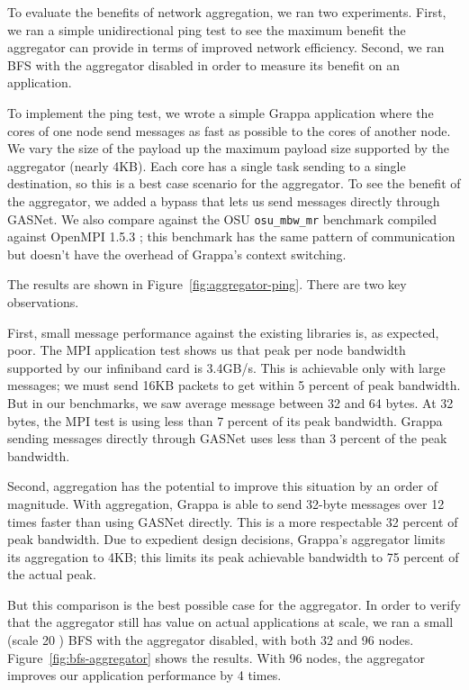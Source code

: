 To evaluate the benefits of network aggregation, we ran two experiments.
First, we ran a simple unidirectional ping test to see the maximum
benefit the aggregator can provide in terms of improved network
efficiency. Second, we ran BFS with the aggregator disabled in order to
measure its benefit on an application.

To implement the ping test, we wrote a simple Grappa application where
the cores of one node send messages as fast as possible to the cores
of another node. We vary the size of the payload up the maximum
payload size supported by the aggregator (nearly 4KB). Each core has a
single task sending to a single destination, so this is a best case
scenario for the aggregator. To see the benefit of the aggregator, we
added a bypass that lets us send messages directly through GASNet. We
also compare against the OSU \texttt{osu\_mbw\_mr} benchmark
  compiled against OpenMPI 1.5.3 ; this
benchmark has the same pattern of communication but doesn't have the
overhead of Grappa's context switching.

The results are shown in Figure~\ref{fig:aggregator-ping}. There are
two key observations.

First, small message performance against the existing libraries is, as expected, poor. The MPI application test shows us that peak per node
bandwidth supported by our infiniband card is 3.4GB/s. This is
achievable only with large messages; we must send 16KB packets to get
within 5 percent of peak bandwidth. But in our benchmarks, we saw
average message between 32 and 64 bytes. At 32 bytes, the MPI test is
using less than 7 percent of its peak bandwidth. Grappa sending
messages directly through GASNet uses less than 3 percent of the peak
bandwidth.

Second, aggregation has the potential to improve this situation by an
order of magnitude. With aggregation, Grappa is able to send 32-byte
messages over 12 times faster than using GASNet directly. This is a
more respectable 32 percent of peak bandwidth. Due to expedient design
decisions, Grappa's aggregator limits its aggregation to 4KB; this
limits its peak achievable bandwidth to 75 percent of the actual
peak.

But this comparison is the best possible case for the aggregator. In
order to verify that the aggregator still has value on actual
applications at scale, we ran a small (scale 20 ) BFS
with the aggregator disabled, with both 32 and 96
nodes. Figure~\ref{fig:bfs-aggregator} shows the results. With 96
nodes, the aggregator improves our application performance by 4 times.

